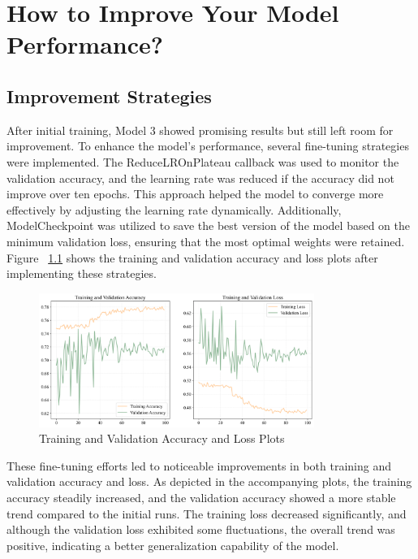 \chapter{How to Improve Your Model Performance?}

\section{Improvement Strategies}
\label{sec:chap4 section 1}

After initial training, Model 3 showed promising results but still left room for improvement. To enhance the model's performance, several fine-tuning strategies were implemented. The ReduceLROnPlateau callback was used to monitor the validation accuracy, and the learning rate was reduced if the accuracy did not improve over ten epochs. This approach helped the model to converge more effectively by adjusting the learning rate dynamically. Additionally, ModelCheckpoint was utilized to save the best version of the model based on the minimum validation loss, ensuring that the most optimal weights were retained. Figure ~\ref{fig:cha-4 figure1} shows the training and validation accuracy and loss plots after implementing these strategies.

\begin{figure}
    \centering
    \includegraphics[width=0.8\textwidth]{figures/Figure32.png}
    \caption{Training and Validation Accuracy and Loss Plots}
    \label{fig:cha-4 figure1}
\end{figure}

These fine-tuning efforts led to noticeable improvements in both training and validation accuracy and loss. As depicted in the accompanying plots, the training accuracy steadily increased, and the validation accuracy showed a more stable trend compared to the initial runs. The training loss decreased significantly, and although the validation loss exhibited some fluctuations, the overall trend was positive, indicating a better generalization capability of the model.

